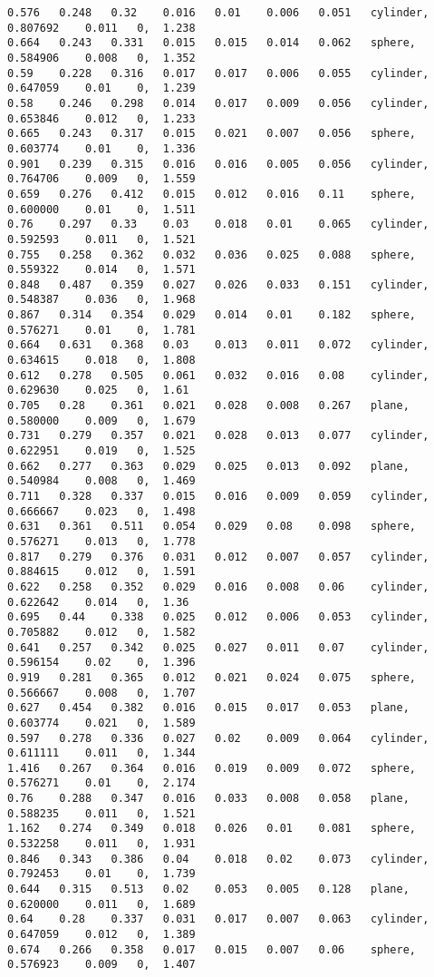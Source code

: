 {\fontsize{7.5}{10} \selectfont
\label{code:cilindroAE}
\begin{lstlisting}[caption={Datos obtenidos para la prueba del cilindro usando AE.}]
0.576	0.248	0.32	0.016	0.01	0.006	0.051	cylinder, 	0.807692	0.011	0, 	1.238
0.664	0.243	0.331	0.015	0.015	0.014	0.062	sphere, 	0.584906	0.008	0, 	1.352
0.59	0.228	0.316	0.017	0.017	0.006	0.055	cylinder, 	0.647059	0.01	0, 	1.239
0.58	0.246	0.298	0.014	0.017	0.009	0.056	cylinder, 	0.653846	0.012	0, 	1.233
0.665	0.243	0.317	0.015	0.021	0.007	0.056	sphere, 	0.603774	0.01	0, 	1.336
0.901	0.239	0.315	0.016	0.016	0.005	0.056	cylinder, 	0.764706	0.009	0, 	1.559
0.659	0.276	0.412	0.015	0.012	0.016	0.11	sphere, 	0.600000	0.01	0, 	1.511
0.76	0.297	0.33	0.03	0.018	0.01	0.065	cylinder, 	0.592593	0.011	0, 	1.521
0.755	0.258	0.362	0.032	0.036	0.025	0.088	sphere, 	0.559322	0.014	0, 	1.571
0.848	0.487	0.359	0.027	0.026	0.033	0.151	cylinder, 	0.548387	0.036	0, 	1.968
0.867	0.314	0.354	0.029	0.014	0.01	0.182	sphere, 	0.576271	0.01	0, 	1.781
0.664	0.631	0.368	0.03	0.013	0.011	0.072	cylinder, 	0.634615	0.018	0, 	1.808
0.612	0.278	0.505	0.061	0.032	0.016	0.08	cylinder, 	0.629630	0.025	0, 	1.61
0.705	0.28	0.361	0.021	0.028	0.008	0.267	plane,  	0.580000	0.009	0, 	1.679
0.731	0.279	0.357	0.021	0.028	0.013	0.077	cylinder, 	0.622951	0.019	0, 	1.525
0.662	0.277	0.363	0.029	0.025	0.013	0.092	plane,  	0.540984	0.008	0, 	1.469
0.711	0.328	0.337	0.015	0.016	0.009	0.059	cylinder, 	0.666667	0.023	0, 	1.498
0.631	0.361	0.511	0.054	0.029	0.08	0.098	sphere, 	0.576271	0.013	0, 	1.778
0.817	0.279	0.376	0.031	0.012	0.007	0.057	cylinder, 	0.884615	0.012	0, 	1.591
0.622	0.258	0.352	0.029	0.016	0.008	0.06	cylinder, 	0.622642	0.014	0, 	1.36
0.695	0.44	0.338	0.025	0.012	0.006	0.053	cylinder, 	0.705882	0.012	0, 	1.582
0.641	0.257	0.342	0.025	0.027	0.011	0.07	cylinder, 	0.596154	0.02	0, 	1.396
0.919	0.281	0.365	0.012	0.021	0.024	0.075	sphere, 	0.566667	0.008	0, 	1.707
0.627	0.454	0.382	0.016	0.015	0.017	0.053	plane,  	0.603774	0.021	0, 	1.589
0.597	0.278	0.336	0.027	0.02	0.009	0.064	cylinder, 	0.611111	0.011	0, 	1.344
1.416	0.267	0.364	0.016	0.019	0.009	0.072	sphere, 	0.576271	0.01	0, 	2.174
0.76	0.288	0.347	0.016	0.033	0.008	0.058	plane,  	0.588235	0.011	0, 	1.521
1.162	0.274	0.349	0.018	0.026	0.01	0.081	sphere, 	0.532258	0.011	0, 	1.931
0.846	0.343	0.386	0.04	0.018	0.02	0.073	cylinder, 	0.792453	0.01	0, 	1.739
0.644	0.315	0.513	0.02	0.053	0.005	0.128	plane,  	0.620000	0.011	0, 	1.689
0.64	0.28	0.337	0.031	0.017	0.007	0.063	cylinder, 	0.647059	0.012	0, 	1.389
0.674	0.266	0.358	0.017	0.015	0.007	0.06	sphere, 	0.576923	0.009	0, 	1.407

\end{lstlisting}}
